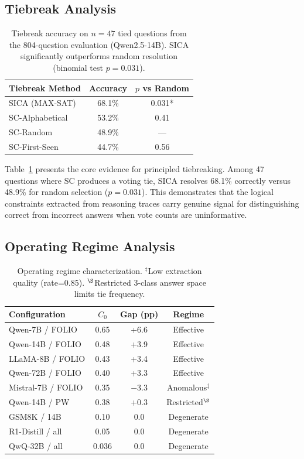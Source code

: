 \documentclass[11pt,a4paper]{article}
\begin{document}
\subsection{Tiebreak Analysis}

\begin{table}[t]
\centering
\small
\begin{tabular}{@{}lcc@{}}
\toprule
\textbf{Tiebreak Method} & \textbf{Accuracy} & \textbf{$p$ vs Random} \\
\midrule
SICA (MAX-SAT) & 68.1\% & 0.031* \\
SC-Alphabetical & 53.2\% & 0.41 \\
SC-Random & 48.9\% & --- \\
SC-First-Seen & 44.7\% & 0.56 \\
\bottomrule
\end{tabular}
\caption{Tiebreak accuracy on $n=47$ tied questions from the 804-question evaluation (Qwen2.5-14B). SICA significantly outperforms random resolution (binomial test $p=0.031$).}
\label{tab:tiebreak}
\end{table}

Table~\ref{tab:tiebreak} presents the core evidence for principled tiebreaking. Among 47 questions where SC produces a voting tie, SICA resolves 68.1\% correctly versus 48.9\% for random selection ($p=0.031$). This demonstrates that the logical constraints extracted from reasoning traces carry genuine signal for distinguishing correct from incorrect answers when vote counts are uninformative.

\subsection{Operating Regime Analysis}
\label{sec:regime}

\begin{table}[t]
\centering
\small
\begin{tabular}{@{}lccc@{}}
\toprule
\textbf{Configuration} & \textbf{$C_0$} & \textbf{Gap (pp)} & \textbf{Regime} \\
\midrule
Qwen-7B / FOLIO & 0.65 & +6.6 & Effective \\
Qwen-14B / FOLIO & 0.48 & +3.9 & Effective \\
LLaMA-8B / FOLIO & 0.43 & +3.4 & Effective \\
Qwen-72B / FOLIO & 0.40 & +3.3 & Effective \\
Mistral-7B / FOLIO & 0.35 & $-$3.3 & Anomalous$^\ddagger$ \\
\midrule
Qwen-14B / PW & 0.38 & +0.3 & Restricted$^\S$ \\
\midrule
GSM8K / 14B & 0.10 & 0.0 & Degenerate \\
R1-Distill / all & 0.05 & 0.0 & Degenerate \\
QwQ-32B / all & 0.036 & 0.0 & Degenerate \\
\bottomrule
\end{tabular}
\caption{Operating regime characterization. $^\ddagger$Low extraction quality (rate=0.85). $^\S$Restricted 3-class answer space limits tie frequency.}
\label{tab:regime}
\end{table}
\end{document}

